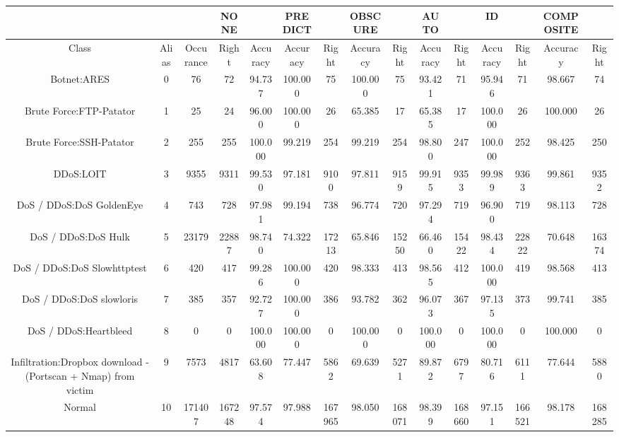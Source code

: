 \begin{table}[htb]
    \centering
    \begin{tabular}{@{}ccccccccccccccc@{}}
        \toprule
         &  &  & NONE &  & PREDICT &  & OBSCURE &  & AUTO &  & ID &  & COMPOSITE &  \\
        \midrule
        Class &  Alias &  Occurance &  Right &  Accuracy &  Accuracy &  Right &  Accuracy &  Right &  Accuracy &  Right &  Accuracy &  Right &  Accuracy &  Right \\
        Botnet:ARES &  0 &  76 &  72 &  94.737 &  100.000 &  75 &  100.000 &  75 &  93.421 &  71 &  95.946 &  71 &  98.667 &  74 \\
        Brute Force:FTP-Patator &  1 &  25 &  24 &  96.000 &  100.000 &  26 &  65.385 &  17 &  65.385 &  17 &  100.000 &  26 &  100.000 &  26 \\
        Brute Force:SSH-Patator &  2 &  255 &  255 &  100.000 &  99.219 &  254 &  99.219 &  254 &  98.800 &  247 &  100.000 &  252 &  98.425 &  250 \\
        DDoS:LOIT &  3 &  9355 &  9311 &  99.530 &  97.181 &  9100 &  97.811 &  9159 &  99.915 &  9353 &  99.989 &  9363 &  99.861 &  9352 \\
        DoS / DDoS:DoS GoldenEye &  4 &  743 &  728 &  97.981 &  99.194 &  738 &  96.774 &  720 &  97.294 &  719 &  96.900 &  719 &  98.113 &  728 \\
        DoS / DDoS:DoS Hulk &  5 &  23179 &  22887 &  98.740 &  74.322 &  17213 &  65.846 &  15250 &  66.460 &  15422 &  98.434 &  22822 &  70.648 &  16374 \\
        DoS / DDoS:DoS Slowhttptest &  6 &  420 &  417 &  99.286 &  100.000 &  420 &  98.333 &  413 &  98.565 &  412 &  100.000 &  419 &  98.568 &  413 \\
        DoS / DDoS:DoS slowloris &  7 &  385 &  357 &  92.727 &  100.000 &  386 &  93.782 &  362 &  96.073 &  367 &  97.135 &  373 &  99.741 &  385 \\
        DoS / DDoS:Heartbleed &  8 &  0 &  0 &  100.000 &  100.000 &  0 &  100.000 &  0 &  100.000 &  0 &  100.000 &  0 &  100.000 &  0 \\
        Infiltration:Dropbox download - (Portscan + Nmap) from victim &  9 &  7573 &  4817 &  63.608 &  77.447 &  5862 &  69.639 &  5271 &  89.872 &  6797 &  80.716 &  6111 &  77.644 &  5880 \\
        Normal &  10 &  171407 &  167248 &  97.574 &  97.988 &  167965 &  98.050 &  168071 &  98.399 &  168660 &  97.151 &  166521 &  98.178 &  168285 \\

\end{tabular}
\end{table}
